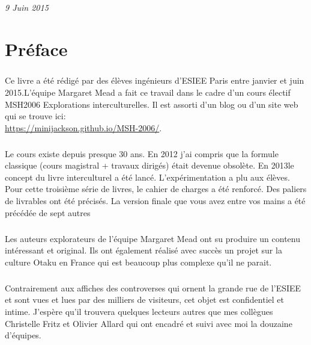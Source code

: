 \documentclass[12pt,twoside]{book}
\begin{document}
\begin{titlepage}
\begin{sffamily}
\begin{center}
\begin{minipage}{0.4\textwidth}
\begin{flushright}
				\emph{9 Juin 2015}
	  \end{flushright}
	\end{minipage}
	\end{center}
	\end{sffamily}
\end{titlepage}

\thispagestyle{empty}

\frontmatter

\thispagestyle{plain}

\chapter*{Préface}

\paragraph{} Ce livre a été rédigé par des élèves ingénieurs d'ESIEE Paris
entre janvier et juin 2015.L'équipe Margaret Mead a fait ce travail dans le
cadre d'un cours électif MSH2006 Explorations interculturelles. Il est assorti
d'un blog ou d'un site web qui se trouve ici:\\
\url{https://minijackson.github.io/MSH-2006/}.

\paragraph{} Le cours existe depuis presque 30 ans.  En 2012 j'ai compris que
la formule classique (cours magistral + travaux dirigés) était devenue
obsolète.  En 2013le concept du livre interculturel a été lancé.
L'expérimentation a plu aux élèves.  Pour cette troisième série de livres, le
cahier de charges a été renforcé. Des paliers de livrables ont été précisés. La
version finale que vous avez entre vos mains a été précédée de sept autres

\paragraph{} Les auteurs explorateurs de l'équipe Margaret Mead ont su produire
un contenu intéressant et original. Ils ont également réalisé avec succès un
projet sur la culture Otaku en France qui est beaucoup plus complexe qu'il ne
parait.

\paragraph{} Contrairement aux affiches des controverses qui ornent la grande
rue de l'ESIEE et sont vues et lues par des milliers de visiteurs, cet objet
est confidentiel et intime.  J'espère qu'il trouvera quelques lecteurs autres
que mes collègues Christelle Fritz et Olivier Allard qui ont encadré et suivi
avec moi la douzaine d'équipes.
\end{document}
